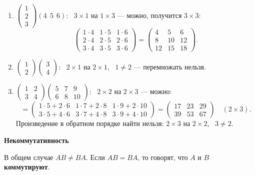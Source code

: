 \documentclass[a4paper,11pt]{article}
\newcommand{\podr}[1]{\par\needspace{8\baselineskip}\medskip
  {\large\bfseries\textcolor{oprc!80!black}{#1}}\par\nopagebreak\smallskip}
\begin{document}
\begin{enumerate}[leftmargin=*]
  \item $\begin{pmatrix} 1 \\ 2 \\ 3 \end{pmatrix} (4\ \ 5\ \ 6)$: \ $3 \times 1$ на $1 \times 3$ --- можно, получится $3 \times 3$:
    \[
      \begin{pmatrix} 1\cdot4 & 1\cdot5 & 1\cdot6 \\ 2\cdot4 & 2\cdot5 & 2\cdot6 \\ 3\cdot4 & 3\cdot5 & 3\cdot6 \end{pmatrix}
      = \begin{pmatrix} 4 & 5 & 6 \\ 8 & 10 & 12 \\ 12 & 15 & 18 \end{pmatrix}.
    \]
  \item $\begin{pmatrix} 1 \\ 2 \end{pmatrix} \begin{pmatrix} 3 \\ 4 \end{pmatrix}$: \ $2 \times 1$ на $2 \times 1$, \ $1 \ne 2$ --- перемножать нельзя.
  \item $\begin{pmatrix} 1 & 2 \\ 3 & 4 \end{pmatrix} \begin{pmatrix} 5 & 7 & 9 \\ 6 & 8 & 10 \end{pmatrix}$: \ $2 \times 2$ на $2 \times 3$ --- можно:
    \[
      = \begin{pmatrix} 1\cdot5 + 2\cdot6 & 1\cdot7 + 2\cdot8 & 1\cdot9 + 2\cdot10 \\ 3\cdot5 + 4\cdot6 & 3\cdot7 + 4\cdot8 & 3\cdot9 + 4\cdot10 \end{pmatrix}
      = \begin{pmatrix} 17 & 23 & 29 \\ 39 & 53 & 67 \end{pmatrix} \quad (2 \times 3).
    \]
    Произведение в обратном порядке найти нельзя: $2 \times 3$ на $2 \times 2$, \ $3 \ne 2$.
\end{enumerate}

\podr{Некоммутативность}

В общем случае $AB \ne BA$. Если $AB = BA$, то говорят, что $A$ и $B$ \textbf{коммутируют}.
\end{document}
